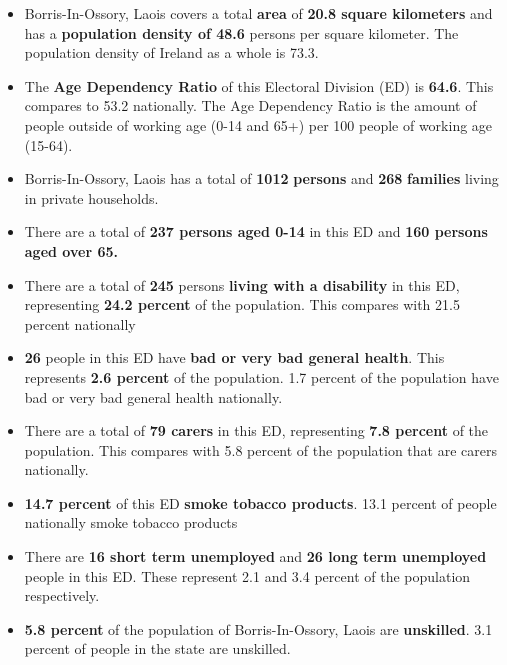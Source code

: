 \documentclass{article}
\begin{document}
\begin{itemize}

\item Borris-In-Ossory, Laois covers a total \textbf{area} of  \textbf{20.8 square kilometers} and has a \textbf{population density of 48.6} persons per square kilometer. The population density of Ireland as a whole is  73.3. 

\item The \textbf{Age Dependency Ratio} of this Electoral Division (ED) is  \textbf{64.6}. This compares to 53.2 nationally. The Age Dependency Ratio is the amount of people outside of working age (0-14 and 65+) per 100 people of working age (15-64). 

\item Borris-In-Ossory, Laois has a total of \textbf{1012} \textbf{persons} and  \textbf{268} \textbf{families} living in private households.

\item There are a total of \textbf{237 persons aged 0-14} in this ED and \textbf{160 persons aged over 65.} 

\item There are a total of \textbf{245} persons \textbf{living with a disability} in this ED, representing \textbf{24.2 percent} of the population. This compares with  21.5 percent nationally

\item \textbf{26} people in this ED have \textbf{bad or very bad general health}. This represents \textbf{2.6 percent} of the population. 1.7 percent of the population have bad or very bad general health nationally. 

\item There are a total of \textbf{79 carers} in this ED, representing \textbf{7.8 percent} of the population. This compares with 5.8 percent of the population that are carers nationally. 

\item \textbf{14.7 percent} of this ED \textbf{smoke tobacco products}. 13.1 percent of people nationally smoke tobacco products

\item There are \textbf{16 short term unemployed} and \textbf{26 long term unemployed} people in this ED. These represent 2.1 and 3.4 percent of the population respectively.

\item  \textbf{5.8 percent} of the population of Borris-In-Ossory, Laois are \textbf{unskilled}. 3.1 percent of people in the state are unskilled.


\end{itemize}
\end{document}

